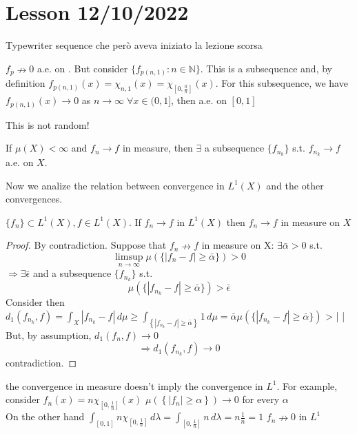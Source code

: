 \section{Lesson 12/10/2022}
Typewriter sequence che però aveva iniziato la lezione scorsa

\begin{remark}
    \( f_p \nrightarrow 0 \) a.e. on \left[ 0, 1\right].  
    But consider \( \{ f_{p(n,1)}: n \in \mathbb{N} \} \). 
    This is a subsequence and, by definition \( f_{p(n, 1)}(x) = \chi_{n, 1}(x)= \chi_{\left[0, \frac{0}{n} \right]}(x) \). 
    For this subsequence, we have \( f_{p(n,1)}(x) \rightarrow 0 \) as \( n \to\infty \; \forall x \in (0, 1] \), then a.e. on \(\left[0, 1\right]\)
\end{remark}
This is not random!

\begin{proposition}
    If \(\mu(X) < \infty \) and \(f_n \rightarrow f \) in measure, then \(\exists\) a subsequence \(\{f_{n_k} \}\) s.t. \(f_{n_k} \to f \) a.e. on \(X\).
\end{proposition}
Now we analize the relation between convergence in \(L^1(X)\) and the other convergences.

\begin{theorem}
    \( \{f_n\} \subset L^1(X), f \in L^1(X) \). If \(f_n \rightarrow f \) in \(L^1(X)\) then \(f_n \rightarrow f \) in measure on \(X\)
\end{theorem}
\begin{proof}
    By contradiction. Suppose that \(f_n \nrightarrow f \) in measure on X: 
    \( \exists \bar{\alpha} > 0 \) s.t. 
    \[ \limsup_{n\to\infty} \mu(\{ |f_n-f| \geq \bar{\alpha} \}) > 0 \]
    \(\Rightarrow \exists \bar{\epsilon}\) and a subsequence \( \{ f_{n_k} \} \) s.t.
    \[ \mu(\{ |f_{n_k}-f| \geq \bar{\alpha} \}) > \bar{\epsilon} \]
    Consider then \(d_1(f_{n_k}, f)= \int_X |f_{n_k} - f| \, d\mu  \geq \int_{\left\{|f_{n_k}-f|\geq \bar{\alpha}  \right\}} 1 \, d\mu 
    = \bar{\alpha} \mu (\{|f_{n_k } - f| \geq \bar{\alpha}\})\) > \bar{\alpha} \bar{\epsilon} 
    But, by assumption, \(d_1(f_n, f) \rightarrow 0\)
    \[ \Rightarrow d_1(f_{n_k}, f) \rightarrow 0 \] 
    contradiction.
\end{proof}

\begin{remark}
    the convergence in measure doesn't imply the convergence in \(L^1\). For example, consider 
    \( f_n (x) = n \chi_\left[0, \frac{1}{n} \right](x) \)
    \( \mu \left( \left\{ |f_n| \geq \alpha \right\}\right) \to 0 \) for every \(\alpha\) \\
    On the other hand \( \int _{\left[0, 1\right]} n \chi_{\left[0, \frac{1}{n} \right]} \, d\lambda = \int_{\left[0, \frac{1}{n}\right]} n \, d\lambda = n \frac{1}{n} = 1\)
    \( f_n \nrightarrow 0\) in \(L^1\) 
\end{remark}


